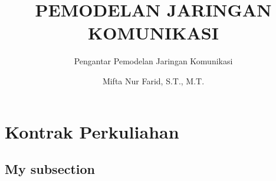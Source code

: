 \documentclass[pdflatex,compress]{beamer}
\title{PEMODELAN JARINGAN KOMUNIKASI}
\subtitle{Pengantar Pemodelan Jaringan Komunikasi}
\author{Mifta Nur Farid, S.T., M.T.}
\begin{document}
\maketitle


\section{Kontrak Perkuliahan}
\subsection{My subsection}


\end{document}
